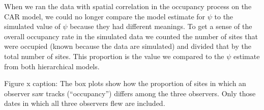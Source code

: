 \documentclass[12pt]{article}
\begin{document}
When we ran the data with spatial correlation in the occupancy process on the 
CAR model, we could no longer compare the model estimate for $\psi$ to the 
simulated value of $\psi$ because they had different meanings. To get a sense of 
the overall occupancy rate in the simulated data we counted the number of sites 
that were occupied (known because the data are simulated) and divided that by 
the total number of sites. This proportion is the value we compared to the $\psi
$ estimate from both hierarchical models.

Figure x caption:
The box plots show how the proportion of sites in which an observer saw tracks 
(``occupancy'') differs among the three observers. Only those dates in which all 
three observers flew are included.
\end{document}
